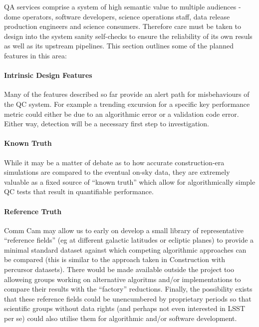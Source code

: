 QA services comprise a system of high semantic value to multiple audiences - dome operators, software developers, science operations staff, data release production engineers and science consumers. Therefore care must be taken to design into the system sanity self-checks to ensure the reliability of its own resuls as well as its upstream pipelines. This section outlines some of the planned features in this area:

\paragraph{Intrinsic Design Features}

Many of the features described so far provide an alert path for misbehaviours of the QC system. For example a trending excursion for a specific key performance metric could either be due to an algorithmic error or a validation code error. Either way, detection will be a necessary first step to investigation.

\paragraph{Known Truth}

While it may be a matter of debate as to how accurate construction-era simulations are compared to the eventual on-sky data, they are extremely valuable as a fixed source of ``known truth'' which allow for algorithmically simple QC tests that result in quantifiable performance.

\paragraph{Reference Truth}

Comm Cam may allow us to early on develop a small library of representative ``reference fields'' (eg at different galactic latitudes or ecliptic planes) to provide a minimal standard dataset against which competing algorithmic approaches can be compared (this is similar to the approach taken in Construction with percursor datasets). There would be made available outside the project too alloweing groups working on alternative algoritms and/or implementations to compare their results with the ``factory'' reductions. Finally, the possibility exists that these reference fields could be unencumbered by proprietary periods so that scientific groups without data rights (and perhaps not even interested in LSST per se) could also utilise them for algorithmic and/or software development.

